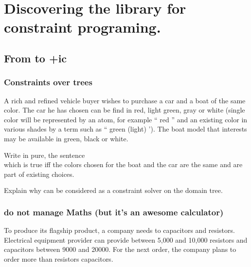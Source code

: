 

\chapter{Discovering the library for constraint programing.}




\section{From \prolog{} to \prolog{}+ic}

\subsection{Constraints over trees}

A rich and refined vehicle buyer wishes to purchase a car and a boat of the same color.
The car he has chosen can be find in red, light green, gray or white (single color will be represented by an atom, for example `` red '' and an existing color in various shades by a term such as `` green (light) ').
The boat model that interests may be available in green, black or white.

\begin{question}
 Write in \prolog{} pure, the sentence \\ which is true iff the colors chosen for the boat and the car are the same and are part of existing choices.
\end{question}

\begin{question}\label{QC1}
Explain why \prolog{} can be considered as a constraint solver on the domain tree.
\end{question}

\subsection{\prolog{} do not manage Maths (but it's an awesome calculator)}
To produce its flagship product, a company needs to capacitors and resistors. Electrical equipment provider can provide between 5,000 and 10,000 resistors and capacitors between 9000 and 20000.
For the next order, the company plans to order more than resistors capacitors.

